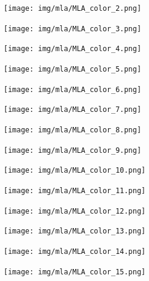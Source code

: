 \documentclass[svgnames]{beamer}
\newcommand{\nonumberingframe}[1]{\begin{frame}{#1}\addtocounter{framenumber}{-1}}
\begin{document}
	\nonumberingframe{\subsubsecname}
	\centering
		\texttt{[image: img/mla/MLA\_color\_2.png]}
	\end{frame}

	\nonumberingframe{\subsubsecname}
	\centering
		\texttt{[image: img/mla/MLA\_color\_3.png]}
	\end{frame}

	\nonumberingframe{\subsubsecname}
	\centering
		\texttt{[image: img/mla/MLA\_color\_4.png]}
	\end{frame}

	\nonumberingframe{\subsubsecname}
	\centering
		\texttt{[image: img/mla/MLA\_color\_5.png]}
	\end{frame}

	\nonumberingframe{\subsubsecname}
	\centering
		\texttt{[image: img/mla/MLA\_color\_6.png]}
	\end{frame}

	\nonumberingframe{\subsubsecname}
	\centering
		\texttt{[image: img/mla/MLA\_color\_7.png]}
	\end{frame}

	\nonumberingframe{\subsubsecname}
	\centering
		\texttt{[image: img/mla/MLA\_color\_8.png]}
	\end{frame}

	\nonumberingframe{\subsubsecname}
	\centering
		\texttt{[image: img/mla/MLA\_color\_9.png]}
	\end{frame}

	\nonumberingframe{\subsubsecname}
	\centering
		\texttt{[image: img/mla/MLA\_color\_10.png]}
	\end{frame}

	\nonumberingframe{\subsubsecname}
	\centering
		\texttt{[image: img/mla/MLA\_color\_11.png]}
	\end{frame}

	\nonumberingframe{\subsubsecname}
	\centering
		\texttt{[image: img/mla/MLA\_color\_12.png]}
	\end{frame}

	\nonumberingframe{\subsubsecname}
	\centering
		\texttt{[image: img/mla/MLA\_color\_13.png]}
	\end{frame}

	\nonumberingframe{\subsubsecname}
	\centering
		\texttt{[image: img/mla/MLA\_color\_14.png]}
	\end{frame}

	\nonumberingframe{\subsubsecname}
	\centering
		\texttt{[image: img/mla/MLA\_color\_15.png]}
	\end{frame}
\end{document}
